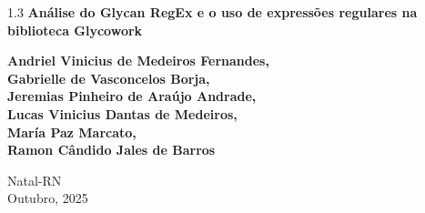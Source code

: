 \begin{titlepage}
\begin{center}
		\vspace{6cm}

		{\setlength{\baselineskip}%
			{1.3\baselineskip}
			{\LARGE \textbf{Análise do Glycan RegEx e o uso de expressões regulares na biblioteca Glycowork}}\par}

		\vspace{2cm}

		{\large \textbf{Andriel Vinicius de Medeiros Fernandes, \\
				Gabrielle de Vasconcelos Borja, \\
				Jeremias Pinheiro de Araújo Andrade, \\
				Lucas Vinicius Dantas de Medeiros, \\
				María Paz Marcato, \\
				Ramon Cândido Jales de Barros \\}}
		\vspace{5cm}

		Natal-RN\\Outubro, 2025
	\end{center}
\end{titlepage}
